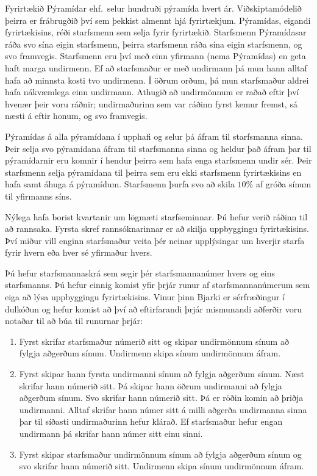 
Fyrirtækið Pýramídar ehf.\ selur hundruði pýramída hvert ár.
Viðskiptamódelið þeirra er frábrugðið því sem þekkist almennt hjá fyrirtækjum.
Pýramídas, eigandi fyrirtækisins, réði starfsmenn sem selja fyrir fyrirtækið.
Starfsmenn Pýramídasar ráða svo sína eigin starfsmenn, þeirra starfsmenn ráða 
sína eigin starfsmenn, og svo framvegis.
Starfsmenn eru því með einn yfirmann (nema Pýramídas) en geta haft marga undirmenn.
Ef að starfsmaður er með undirmann þá mun hann alltaf hafa að
minnsta kosti tvo undirmenn.
Í öðrum orðum, þá mun starfsmaður aldrei hafa nákvæmlega einn undirmann.
Athugið að undirmönnum er raðað eftir því hvenær þeir voru ráðnir;
undirmaðurinn sem var ráðinn fyrst kemur fremst, sá næsti á eftir honum, og svo
framvegis.

Pýramídas á alla pýramídana í upphafi og selur þá áfram til starfsmanna sinna.
Þeir selja svo pýramídana áfram til starfsmanna sinna og heldur það áfram
þar til pýramídarnir eru komnir í hendur þeirra sem hafa enga starfsmenn undir sér.
Þeir starfsmenn selja pýramídana til þeirra sem eru ekki starfsmenn fyrirtækisins
en hafa samt áhuga á pýramídum.
Starfsmenn þurfa svo að skila $10\%$ af gróða sínum til yfirmanns síns.

Nýlega hafa borist kvartanir um lögmæti starfseminnar.
Þú hefur verið ráðinn til að rannsaka.
Fyrsta skref rannsóknarinnar er að skilja uppbyggingu fyrirtækisins.
Því miður vill enginn starfsmaður veita þér neinar upplýsingar um hverjir starfa
fyrir hvern eða hver sé yfirmaður hvers.

Þú hefur starfsmannaskrá sem segir þér starfsmannanúmer hvers og eins starfsmanns.
Þú hefur einnig komist yfir þrjár runur af starfsmannanúmerum sem eiga að lýsa
uppbyggingu fyrirtækisins.
Vinur þinn Bjarki er sérfræðingur í dulkóðun og hefur komist að því að
eftirfarandi þrjár mismunandi aðferðir voru notaðar til að búa til runurnar
þrjár:

\begin{enumerate}
    \item Fyrst skrifar starfsmaður númerið sitt og skipar undirmönnum sínum að
          fylgja aðgerðum sínum. Undirmenn skipa sínum undirmönnum áfram.
    \item Fyrst skipar hann fyrsta undirmanni sínum að fylgja aðgerðum sínum.
          Næst skrifar hann númerið sitt.
          Þá skipar hann öðrum undirmanni að fylgja aðgerðum sínum.
          Svo skrifar hann númerið sitt.
          Þá er röðin komin að þriðja undirmanni.
          Alltaf skrifar hann númer sitt á milli aðgerða undirmanna sinna þar 
          til síðasti undirmaðurinn hefur klárað.
          Ef starfsmaður hefur engan undirmann þá skrifar hann númer sitt einu sinni.
    \item Fyrst skipar starfsmaður undirmönnum sínum að fylgja aðgerðum sínum og 
          svo skrifar hann númerið sitt. Undirmenn skipa sínum undirmönnum áfram.
\end{enumerate}


